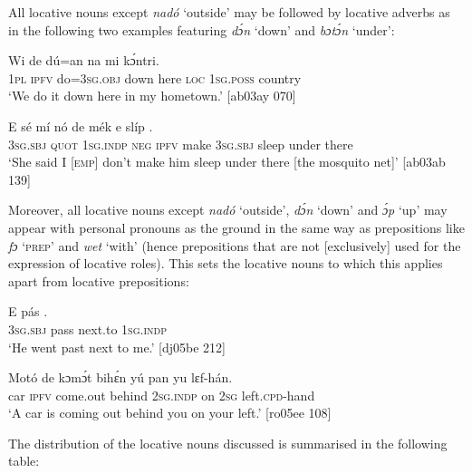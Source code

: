All locative nouns except \textit{nadó} ‘outside’ may be followed by locative adverbs as in the following two examples featuring \textit{dɔ́n} ‘down’ and \textit{bɔtɔ́n} ‘under’: 


\ea%
    \label{ex:key:931}
    \gll Wi  de  dú=an           na  mi    kɔ́ntri.\\
\textsc{1pl}  \textsc{ipfv}  do=\textsc{3sg.obj}  down  here    \textsc{loc}  \textsc{1sg.poss}  country\\

\glt ‘We do it down here in my hometown.’ [ab03ay 070]
\z


\ea%
    \label{ex:key:932}
    \gll E    sé    mí    nó  de  mék    e    slíp    .\\
\textsc{3sg.sbj}  \textsc{quot}    \textsc{1sg.indp}  \textsc{neg}  \textsc{ipfv}  make  \textsc{3sg.sbj}  sleep  under  there\\

\glt ‘She said I [\textsc{emp}] don’t make him sleep under there [the mosquito net]’ [ab03ab 139]
\z

Moreover, all locative nouns except \textit{nadó} ‘outside’, \textit{dɔ́n} ‘down’ and \textit{ɔ́p} ‘up’ may appear with personal pronouns as the ground in the same way as prepositions like \textit{fɔ} ‘\textsc{prep’} and \textit{wet} ‘with’ (hence prepositions that are not [exclusively] used for the expression of locative roles). This sets the locative nouns to which this applies apart from locative prepositions: 


\ea%
    \label{ex:key:933}
    \gll E    pás      .\\
\textsc{3sg.sbj}  pass    next.to  \textsc{1sg.indp}\\

\glt ‘He went past next to me.’ [dj05be 212]
\z


\ea%
    \label{ex:key:934}
    \gll Motó  de  kɔmɔ́t    bihɛ́n  yú    pan  yu  lɛf-hán.\\
car    \textsc{ipfv}  come.out  behind  \textsc{2sg.indp}  on  \textsc{2sg}  left.\textsc{cpd}{}-hand\\

\glt ‘A car is coming out behind you on your left.’ [ro05ee 108]
\z

The distribution of the locative nouns discussed is summarised in the following table: 

